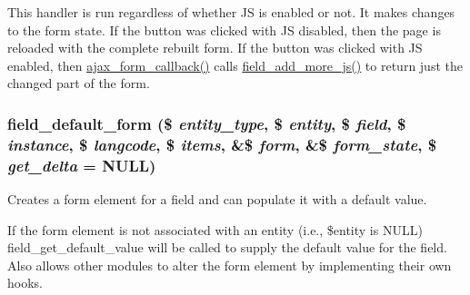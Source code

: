 This handler is run regardless of whether JS is enabled or not. It makes changes to the form state. If the button was clicked with JS disabled, then the page is reloaded with the complete rebuilt form. If the button was clicked with JS enabled, then \hyperlink{group__ajax_gabe2739824006df057d291f6be49759ab}{ajax\_\-form\_\-callback()} calls \hyperlink{field_8form_8inc_a8e5c072d17551aa6112f4ea27328b9d6}{field\_\-add\_\-more\_\-js()} to return just the changed part of the form. \hypertarget{field_8form_8inc_ac46022d7310dd8d6eb0409e4175e18c0}{
\subsubsection[{field\_\-default\_\-form}]{\setlength{\rightskip}{0pt plus 5cm}field\_\-default\_\-form (\$ {\em entity\_\-type}, \/  \$ {\em entity}, \/  \$ {\em field}, \/  \$ {\em instance}, \/  \$ {\em langcode}, \/  \$ {\em items}, \/  \&\$ {\em form}, \/  \&\$ {\em form\_\-state}, \/  \$ {\em get\_\-delta} = {\ttfamily NULL})}}
\label{field_8form_8inc_ac46022d7310dd8d6eb0409e4175e18c0}
Creates a form element for a field and can populate it with a default value.

If the form element is not associated with an entity (i.e., \$entity is NULL) field\_\-get\_\-default\_\-value will be called to supply the default value for the field. Also allows other modules to alter the form element by implementing their own hooks.


